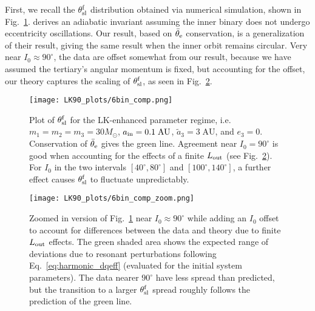 \documentclass[
        twocolumn,
        twocolappendix
    ]{aastex63}
\begin{document}
First, we recall the $\theta_{\rm sl}^{\rm f}$ distribution obtained via
numerical simulation, shown in Fig.~\ref{fig:bin_comp}. \citet{bin1} derives an
adiabatic invariant assuming the inner binary does not undergo eccentricity
oscillations. Our result, based on $\bar{\theta}_{\rm e}$ conservation, is a
generalization of their result, giving the same result when the inner orbit
remains circular. Very near $I_0 \approx 90^\circ$, the data are offset somewhat
from our result, because we have assumed the tertiary's angular momentum is
fixed, but accounting for the offset, our theory captures the scaling of
$\theta_{\rm sl}^{\rm f}$, as seen in Fig.~\ref{fig:bin_comp_zoom}.

\begin{figure}
    \centering
    \texttt{[image: LK90\_plots/6bin\_comp.png]}
    \caption{Plot of $\theta_{\rm sl}^{\rm f}$ for the LK-enhanced parameter
    regime, i.e.\ $m_1 = m_2 = m_3 = 30M_{\odot}$,
    $a_{\rm in} = 0.1\;\mathrm{AU}$, $\tilde{a}_3 = 3\;\mathrm{AU}$, and $e_3
    = 0$. Conservation of $\bar{\theta}_{\rm e}$ gives the green line. Agreement near
    $I_0 = 90^\circ$ is good when accounting for the effects of a finite
    $L_{\rm out}$ (see Fig.~\ref{fig:bin_comp_zoom}). For $I_0$ in the two
    intervals $[40^\circ, 80^\circ]$ and $[100^\circ, 140^\circ]$, a further
    effect causes $\theta_{\rm sl}^{\rm f}$ to fluctuate
    unpredictably.}\label{fig:bin_comp}
\end{figure}

\begin{figure}
    \centering
    \texttt{[image: LK90\_plots/6bin\_comp\_zoom.png]}
    \caption{Zoomed in version of Fig.~\ref{fig:bin_comp} near $I_0 \approx
    90^\circ$ while adding an $I_0$ offset to account for differences between
    the data and theory due to finite $L_{\rm out}$ effects. The green shaded
    area shows the expected range of deviations due to resonant perturbations
    following Eq.~\eqref{eq:harmonic_dqeff} (evaluated for the initial system
    parameters). The data nearer $90^\circ$ have less spread than predicted, but
    the transition to a larger $\theta_{\rm sl}^{\rm f}$ spread roughly follows
    the prediction of the green line.}\label{fig:bin_comp_zoom}
\end{figure}
\end{document}
